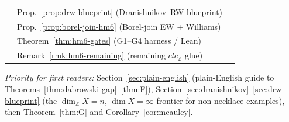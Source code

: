 \documentclass[11pt]{article}
\theoremstyle{definition}
\newcommand{\checkbox}{\fbox{\phantom{X}}}
\begin{document}
\begin{tabular}{@{}clp{7.8cm}@{}}
\checkbox & Prop.~\ref{prop:drw-blueprint} (Dranishnikov--RW blueprint) & \underline{\hspace{2.5cm}} \\
\checkbox & Prop.~\ref{prop:borel-join-hm6} (Borel-join EW + Williams) & \underline{\hspace{2.5cm}} \\
\checkbox & Theorem~\ref{thm:hm6-gates} (G1--G4 harness / Lean) & \underline{\hspace{2.5cm}} \\
\checkbox & Remark~\ref{rmk:hm6-remaining} (remaining $clc_{\mathbb{Z}}$ glue) & \underline{\hspace{2.5cm}} \\
\bottomrule
\end{tabular}

\vspace{1em}
\noindent\textit{Priority for first readers:} Section~\ref{sec:plain-english}
(plain-English guide to Theorems~\ref{thm:dabrowski-gap}--\ref{thm:F}),
Section~\ref{sec:dranishnikov}--\ref{sec:drw-blueprint} (the
$\dim_{\mathbb{Z}}X=n$, $\dim X=\infty$ frontier for non-necklace examples),
then Theorem~\ref{thm:G} and Corollary~\ref{cor:mcauley}.
\end{document}

